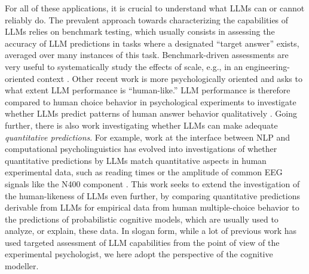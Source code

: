 \documentclass[fleqn]{article}
\begin{document}
For all of these applications, it is crucial to understand what LLMs can or cannot reliably do.
The prevalent approach towards characterizing the capabilities of LLMs relies on benchmark testing, which usually consists in assessing the accuracy of LLM predictions in tasks where a designated ``target answer'' exists, averaged over many instances of this task.
Benchmark-driven assessments are very useful to systematically study the effects of scale, e.g., in an engineering-oriented context \citep[e.g.,][]{srivastava2023-BIGbench}.
Other recent work is more psychologically oriented and asks to what extent LLM performance is ``human-like.''
LLM performance is therefore compared to human choice behavior in psychological experiments to investigate whether LLMs predict patterns of human answer behavior qualitatively \citep[e.g.,][]{BinzSchulz2023:Using-cognitive,Hagendorff2023:Machine-Psychol,ShiffrinMitchell2023:Probing-the-psy}.
Going further, there is also work investigating whether LLMs can make adequate \emph{quantitative predictions}.
For example, work at the interface between NLP and computational psycholinguistics \citep{MarvinLinzen2018:Targeted-Syntac,HuGauthier2020:A-Systematic-As} has evolved into investigations of whether quantitative predictions by LLMs match quantitative aspects in human experimental data, such as reading times \citep{WilcoxVani2021:A-Targeted-Asse} or the amplitude of common EEG signals like the N400 component \citep{LindborgRabovsky2021:Meaning-in-brai}.
This work seeks to extend the investigation of the human-likeness of LLMs even further, by comparing quantitative predictions derivable from LLMs for empirical data from human multiple-choice behavior to the predictions of probabilistic cognitive models, which are usually used to analyze, or explain, these data.
In slogan form, while a lot of previous work has used targeted assessment of LLM capabilities from the point of view of the experimental psychologist, we here adopt the perspective of the cognitive modeller.
\end{document}
